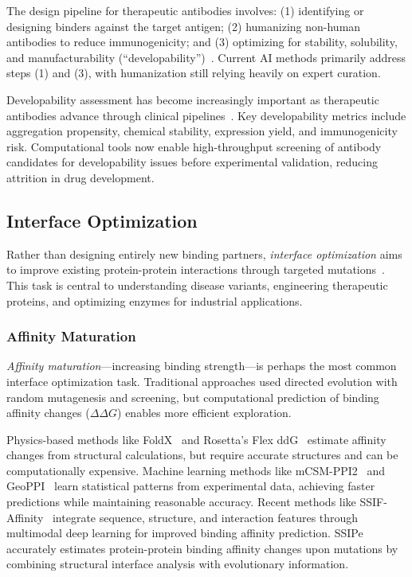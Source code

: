 The design pipeline for therapeutic antibodies involves: (1) identifying or designing binders against the target antigen; (2) humanizing non-human antibodies to reduce immunogenicity; and (3) optimizing for stability, solubility, and manufacturability (``developability'')~\cite{abanades2023immunebuilder}. Current AI methods primarily address steps (1) and (3), with humanization still relying heavily on expert curation.

Developability assessment has become increasingly important as therapeutic antibodies advance through clinical pipelines~\cite{raybould2019developability}. Key developability metrics include aggregation propensity, chemical stability, expression yield, and immunogenicity risk. Computational tools now enable high-throughput screening of antibody candidates for developability issues before experimental validation, reducing attrition in drug development.

\subsection{Interface Optimization}
\label{subsec:interface}

Rather than designing entirely new binding partners, \textit{interface optimization} aims to improve existing protein-protein interactions through targeted mutations~\cite{jankauskaite2019skempi2}. This task is central to understanding disease variants, engineering therapeutic proteins, and optimizing enzymes for industrial applications.

\subsubsection{Affinity Maturation}

\textit{Affinity maturation}---increasing binding strength---is perhaps the most common interface optimization task. Traditional approaches used directed evolution with random mutagenesis and screening, but computational prediction of binding affinity changes ($\Delta\Delta G$) enables more efficient exploration.

Physics-based methods like FoldX~\cite{guerois2005foldx} and Rosetta's Flex ddG~\cite{barlow2018flexddg} estimate affinity changes from structural calculations, but require accurate structures and can be computationally expensive. Machine learning methods like mCSM-PPI2~\cite{rodrigues2019mcsm} and GeoPPI~\cite{liu2021geoppi} learn statistical patterns from experimental data, achieving faster predictions while maintaining reasonable accuracy. Recent methods like SSIF-Affinity~\cite{liu2024ssifaffinity} integrate sequence, structure, and interaction features through multimodal deep learning for improved binding affinity prediction. SSIPe~\cite{li2022ssipe} accurately estimates protein-protein binding affinity changes upon mutations by combining structural interface analysis with evolutionary information.

